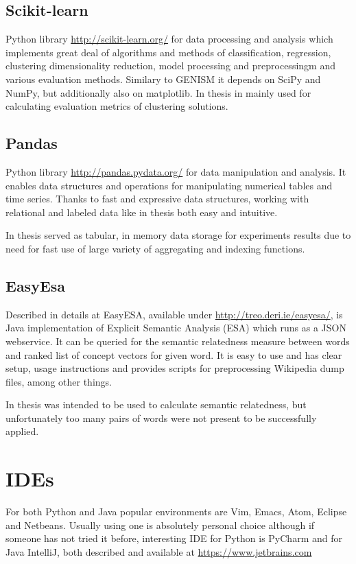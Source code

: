 \documentclass[a4paper, 12pt, oneside]{Thesis} %
\begin{document}
\subsection{Scikit-learn} Python library \url{http://scikit-learn.org/} for data processing and analysis which implements great deal of algorithms and methods of classification, regression, clustering dimensionality reduction, model processing and preprocessingm and various evaluation methods. Similary to GENISM it depends on SciPy and NumPy, but additionally also on matplotlib. 
In thesis in mainly used for calculating evaluation metrics of clustering solutions.

\subsection{Pandas} Python library \url{http://pandas.pydata.org/} for data manipulation and analysis. It enables data structures and operations for manipulating numerical tables and time series. Thanks to fast and expressive data structures, working with relational and labeled data like in thesis both easy and intuitive.

In thesis served as tabular, in memory data storage for experiments results due to need for fast use of large variety of aggregating and indexing functions.

\subsection{EasyEsa} Described in details at \cite{carvalho2014easyesa} EasyESA, available under \url{http://treo.deri.ie/easyesa/}, is Java implementation of Explicit Semantic Analysis (ESA) which runs as a JSON webservice. It can be queried for the semantic relatedness measure between words and ranked list of concept vectors for given word. It is easy to use and has clear setup, usage instructions and provides scripts for preprocessing Wikipedia dump files, among other things.

In thesis was intended to be used to calculate semantic relatedness, but unfortunately too many pairs of words were not present to be successfully applied.

\section{IDEs} For both Python and Java popular environments are Vim, Emacs, Atom, Eclipse and Netbeans. Usually using one is absolutely personal choice although if someone has not tried it before, interesting IDE for Python is PyCharm and for Java IntelliJ, both described and available at \url{https://www.jetbrains.com}
\end{document}
